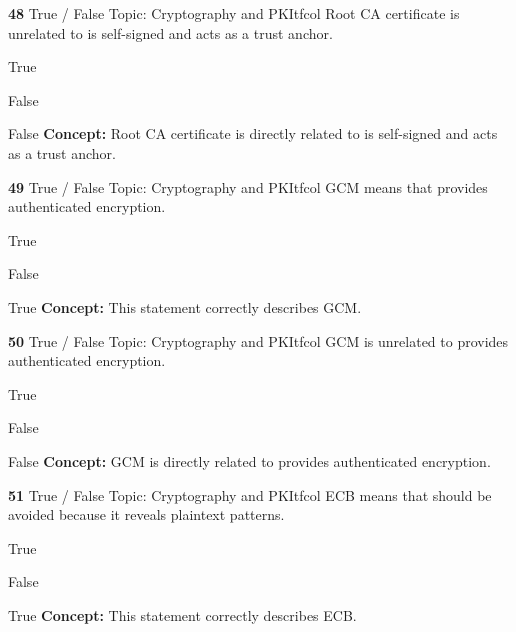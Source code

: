 \documentclass[10pt,a4paper]{article}
\begin{document}
\begin{qcard}{\color{white}\textbf{48} \hfill \small True / False \textbar{} Topic: Cryptography and PKI}{tfcol}
Root CA certificate is unrelated to is self-signed and acts as a trust anchor.

\begin{qoptions}
\item True
\item False
\end{qoptions}
\begin{explainbox}{False}
\textbf{Concept:} Root CA certificate is directly related to is self-signed and acts as a trust anchor.
\end{explainbox}
\end{qcard}

\begin{qcard}{\color{white}\textbf{49} \hfill \small True / False \textbar{} Topic: Cryptography and PKI}{tfcol}
GCM means that provides authenticated encryption.

\begin{qoptions}
\item True
\item False
\end{qoptions}
\begin{explainbox}{True}
\textbf{Concept:} This statement correctly describes GCM.
\end{explainbox}
\end{qcard}

\begin{qcard}{\color{white}\textbf{50} \hfill \small True / False \textbar{} Topic: Cryptography and PKI}{tfcol}
GCM is unrelated to provides authenticated encryption.

\begin{qoptions}
\item True
\item False
\end{qoptions}
\begin{explainbox}{False}
\textbf{Concept:} GCM is directly related to provides authenticated encryption.
\end{explainbox}
\end{qcard}

\begin{qcard}{\color{white}\textbf{51} \hfill \small True / False \textbar{} Topic: Cryptography and PKI}{tfcol}
ECB means that should be avoided because it reveals plaintext patterns.

\begin{qoptions}
\item True
\item False
\end{qoptions}
\begin{explainbox}{True}
\textbf{Concept:} This statement correctly describes ECB.
\end{explainbox}
\end{qcard}
\end{document}
